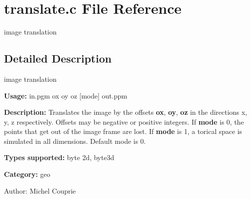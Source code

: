 \section{translate.c File Reference}
\label{translate_8c}
image translation  




\label{_details}
\subsection{Detailed Description}
image translation 

{\bf Usage:} in.pgm ox oy oz [mode] out.ppm

{\bf Description:} Translates the image by the offsets {\bf ox}, {\bf oy}, {\bf oz} in the directions x, y, z respectively. Offsets may be negative or positive integers. If {\bf mode} is 0, the points that get out of the image frame are lost. If {\bf mode} is 1, a torical space is simulated in all dimensions. Default mode is 0.

{\bf Types supported:} byte 2d, byte3d

{\bf Category:} geo

\begin{Desc}
\item[Author:]Michel Couprie \end{Desc}
